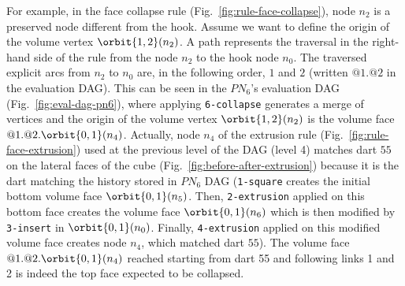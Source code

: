 For example, in the face collapse rule (Fig.~\ref{fig:rule-face-collapse}), node $n_2$ is a preserved node different from the hook. Assume we want to define the origin of the volume vertex $\orbit{1,2}(n_2)$.
A path represents the traversal in the right-hand side of the rule from the node $n_{2}$ to the hook node $n_{0}$. The traversed explicit arcs from $n_{2}$ to $n_{0}$ are, in the following order, $1$ and $2$ (written $@1.@2$ in the evaluation DAG).
This can be seen in the $PN_{6}$'s evaluation DAG (Fig.~\ref{fig:eval-dag-pn6}), where  %
applying \verb+6-collapse+ 
generates a merge of vertices and the origin of the volume vertex $\orbit{1,2}(n_{2})$ is the volume face $@1.@2.\orbit{0,1}(n_{4})$.
Actually,
node $n_4$ of the extrusion rule (Fig.~\ref{fig:rule-face-extrusion}) used at the pre\-vious level of the DAG (level 4) matches dart $55$ on the lateral faces of the cube (Fig.~\ref{fig:before-after-extrusion}) because it is the dart matching the his\-to\-ry stored in $PN_6$ DAG (\verb+1-square+ creates the initial bottom vo\-lu\-me face $\orbit{0,1}(n_5)$. Then, \verb+2-extrusion+ applied on this bottom face creates the volume face $\orbit{0,1}(n_6)$ which is then modified by \verb+3-insert+ in $\orbit{0,1}(n_0)$. Finally, \verb+4-extrusion+ applied on this modified volume face creates node $n_4$, which matched dart $55$).
The volume face $@1.@2.\orbit{0,1}(n_{4})$ reached starting from dart 55 and following links 1 and 2 is indeed the top face expected to be collapsed.    





